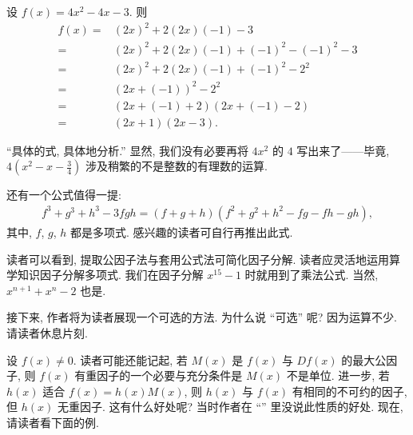 \begin{example}
    设 $f(x) = 4x^2 - 4x - 3$. 则
    \begin{align*}
        f(x)
        = {} & (2x)^2 + 2 (2x) (-1) - 3                   \\
        = {} & (2x)^2 + 2 (2x) (-1) + (-1)^2 - (-1)^2 - 3 \\
        = {} & (2x)^2 + 2 (2x) (-1) + (-1)^2 - 2^2        \\
        = {} & (2x + (-1))^2 - 2^2                        \\
        = {} & (2x + (-1) + 2) (2x + (-1) - 2)            \\
        = {} & (2x + 1) (2x - 3).
    \end{align*}

    ``具体的式, 具体地分析.'' 显然, 我们没有必要再将 $4x^2$ 的 $4$ 写出来了——毕竟, $4 \left(x^2 - x - \frac{3}{4} \right)$ 涉及稍繁的不是整数的有理数的运算.
\end{example}

还有一个公式值得一提:
\begin{align*}
    f^3 + g^3 + h^3 - 3fgh = (f + g + h)(f^2 + g^2 + h^2 - fg - fh - gh),
\end{align*}
其中, $f$, $g$, $h$ 都是多项式. 感兴趣的读者可自行再推出此式.

读者可以看到, 提取公因子法与套用公式法可简化因子分解. 读者应灵活地运用算学知识因子分解多项式. 我们在因子分解 $x^{15} - 1$ 时就用到了乘法公式. 当然, $x^{n+1} + x^n - 2$ 也是.

接下来, 作者将为读者展现一个可选的方法. 为什么说 ``可选'' 呢? 因为运算不少. 请读者休息片刻.

\myLine

设 $f(x) \neq 0$. 读者可能还能记起, 若 $M(x)$ 是 $f(x)$ 与 $Df(x)$ 的最大公因子, 则 $f(x)$ 有重因子的一个必要与充分条件是 $M(x)$ 不是单位. 进一步, 若 $h(x)$ 适合 $f(x) = h(x)M(x)$, 则 $h(x)$ 与 $f(x)$ 有相同的不可约的因子, 但 $h(x)$ 无重因子. 这有什么好处呢? 当时作者在 ``\MultipleFactors '' 里没说此性质的好处. 现在, 请读者看下面的例.

